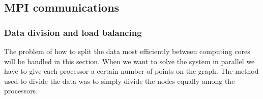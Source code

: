 \documentclass[pdftex,12pt,a4paper]{article}
\begin{document}

\subsection{MPI communications}



\subsubsection{Data division and load balancing}

The problem of how to split the data most efficiently between computing cores will be handled in this section. When we want to solve the system in parallel we have to give each processor a certain number of points on the graph. The method used to divide the data was to simply divide the nodes equally among the processors. 
\end{document}
